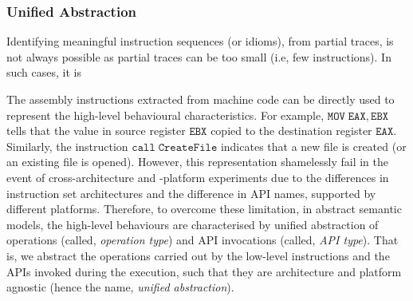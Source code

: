 \subsubsection{Unified Abstraction} 
Identifying meaningful instruction sequences (or idioms), from partial traces, is not always possible as partial traces can be too small (i.e, few instructions). In such cases, it is  

The assembly instructions extracted from  machine code can be directly used to represent the high-level behavioural characteristics. For example, $\mathtt{MOV\;EAX,EBX}$ tells that the value in source register $\mathtt{EBX}$ copied to the destination register $\mathtt{EAX}$. Similarly, the instruction $\mathtt{call\;CreateFile}$ indicates that a new file is created (or an existing file is opened). However, this representation shamelessly fail in the event of cross-architecture and -platform experiments due to the differences in instruction set architectures and the difference in API names, supported by different platforms. Therefore, to overcome these limitation, in abstract semantic models, the high-level behaviours are characterised by unified abstraction of operations (called, \textit{operation type}) and API invocations (called, \textit{API type}). That is, we abstract the operations carried out by the low-level instructions and the APIs invoked during the execution, such that they are architecture and platform agnostic (hence the name, \textit{unified abstraction}). 

